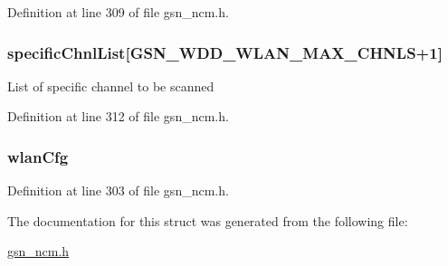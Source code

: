 Definition at line 309 of file gsn\_\-ncm.h.

\hypertarget{a00157_adcb5177c2842c84bf4ce839354d663d3}{
\subsubsection[{specificChnlList}]{ {\bf specificChnlList}\mbox{[}GSN\_\-WDD\_\-WLAN\_\-MAX\_\-CHNLS+1\mbox{]}}}
\label{a00157_adcb5177c2842c84bf4ce839354d663d3}
List of specific channel to be scanned 

Definition at line 312 of file gsn\_\-ncm.h.

\hypertarget{a00157_af502582a323e9463e53f37b1fbd785bc}{
\subsubsection[{wlanCfg}]{ {\bf wlanCfg}}}
\label{a00157_af502582a323e9463e53f37b1fbd785bc}


Definition at line 303 of file gsn\_\-ncm.h.



The documentation for this struct was generated from the following file:\begin{DoxyCompactItemize}
\item 
\hyperlink{a00529}{gsn\_\-ncm.h}\end{DoxyCompactItemize}
